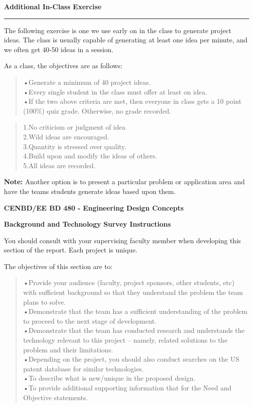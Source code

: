 \begin{enumerate}
\begin{onlysolution}
\textbf{Additional In-Class Exercise}
\noindent\rule[0.5ex]{\linewidth}{1pt}

The following exercise is one we use early on in the class to generate
project ideas. The class is usually capable of generating at least one
idea per minute, and we often get 40-50 ideas in a session.

As a class, the objectives are as follows:

\begin{quote}
•Generate a minimum of 40 project ideas.\\
•Every single student in the class must offer at least on idea.\\
•If the two above criteria are met, then everyone in class gets a 10
point (100\%) quiz grade. Otherwise, no grade recorded.
\end{quote}


\begin{quote}
1.No criticism or judgment of idea\\
2.Wild ideas are encouraged.\\
3.Quantity is stressed over quality.\\
4.Build upon and modify the ideas of others.\\
5.All ideas are recorded.
\end{quote}

\textbf{Note:} Another option is to present a particular problem
or application area and have the teams students generate ideas based
upon them.

\textbf{CENBD/EE BD 480 - Engineering Design Concepts}\\
\textbf{}

\begin{center}
\textbf{Background and Technology Survey Instructions}
\end{center}

You should consult with your supervising faculty member when developing
this section of the report. Each project is unique.

The objectives of this section are to:
\begin{quote}
•Provide your audience (faculty, project sponsors, other students, etc)
with sufficient background so that they understand the problem the team
plans to solve.\\
•Demonstrate that the team has a sufficient understanding of the problem
to proceed to the next stage of development.\\
•Demonstrate that the team has conducted research and understands the
technology relevant to this project -- namely, related solutions to the
problem and their limitations.\\
•Depending on the project, you should also conduct searches on the US
patent database for similar technologies.\\
•To describe what is new/unique in the proposed design.\\
•To provide additional supporting information that for the Need and
Objective statements.
\end{quote}


\end{onlysolution}
\end{enumerate}
